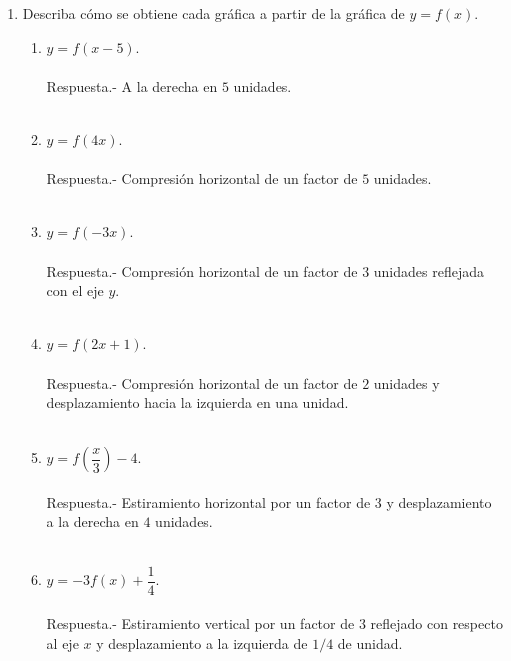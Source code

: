 \begin{enumerate}
\begin{enumerate}[\bfseries a)]
\end{enumerate}

\item Describa cómo se obtiene cada gráfica a partir de la gráfica de $y=f(x)$.\\
\begin{enumerate}[\bfseries a)]

    \item $y=f(x-5)$.\\\\
	Respuesta.-\; A la derecha en $5$ unidades.\\\\

    \item $y=f(4x)$.\\\\
	Respuesta.-\; Compresión horizontal  de un factor de $5$ unidades.\\\\

    \item $y=f(-3x)$.\\\\ 
	Respuesta.-\; Compresión horizontal de un factor de $3$ unidades reflejada con el eje $y$.\\\\

    \item $y=f(2x+1)$.\\\\ 
	Respuesta.-\; Compresión horizontal de un factor de $2$ unidades y desplazamiento hacia la izquierda en una unidad.\\\\

    \item $y=f\left(\dfrac{x}{3}\right) - 4$.\\\\ 
	Respuesta.-\; Estiramiento horizontal por un factor de $3$ y desplazamiento a la derecha en $4$ unidades. \\\\
 
    \item $y = -3f(x) + \dfrac{1}{4}$.\\\\   
	Respuesta.-\; Estiramiento vertical por un factor de $3$ reflejado con respecto al eje $x$ y desplazamiento a la izquierda de $1/4$ de unidad.\\\\


\end{enumerate}
\end{enumerate}
